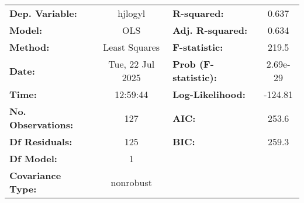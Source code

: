 \begin{center}
\begin{tabular}{lclc}
\toprule
\textbf{Dep. Variable:}    &     hjlogyl      & \textbf{  R-squared:         } &    0.637  \\
\textbf{Model:}            &       OLS        & \textbf{  Adj. R-squared:    } &    0.634  \\
\textbf{Method:}           &  Least Squares   & \textbf{  F-statistic:       } &    219.5  \\
\textbf{Date:}             & Tue, 22 Jul 2025 & \textbf{  Prob (F-statistic):} & 2.69e-29  \\
\textbf{Time:}             &     12:59:44     & \textbf{  Log-Likelihood:    } &  -124.81  \\
\textbf{No. Observations:} &         127      & \textbf{  AIC:               } &    253.6  \\
\textbf{Df Residuals:}     &         125      & \textbf{  BIC:               } &    259.3  \\
\textbf{Df Model:}         &           1      & \textbf{                     } &           \\
\textbf{Covariance Type:}  &    nonrobust     & \textbf{                     } &           \\
\bottomrule
\end{tabular}
\end{center}